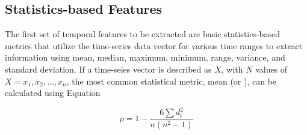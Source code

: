\subsection{Statistics-based Features}
\label{sec:statisticsfeatures}

The first set of temporal features to be extracted are basic statistics-based metrics that utilize the time-series data vector for various time ranges to extract information using mean, median, maximum, minimum, range, variance, and standard deviation. If a time-seies vector is described as $X$, with $N$ values of $X = {x_1, x_2,...,x_n}$, the most common statistical metric, mean (or \mu), can be calculated using Equation

\begin{equation}
\rho = 1 - \frac{6\sum d_i^2}{n(n^2-1)}
\label{eq:mean}
\end{equation}
